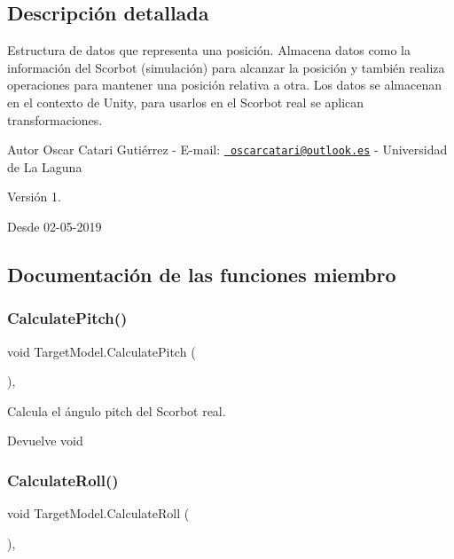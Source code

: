 \subsection{Descripción detallada}
Estructura de datos que representa una posición. Almacena datos como la información del Scorbot (simulación) para alcanzar la posición y también realiza operaciones para mantener una posición relativa a otra. Los datos se almacenan en el contexto de Unity, para usarlos en el Scorbot real se aplican transformaciones. \begin{DoxyAuthor}{Autor}
Oscar Catari Gutiérrez -\/ E-\/mail\+: \href{mailto:oscarcatari@outlook.es}{\texttt{ oscarcatari@outlook.\+es}} -\/ Universidad de La Laguna 
\end{DoxyAuthor}
\begin{DoxyVersion}{Versión}
1. 
\end{DoxyVersion}
\begin{DoxySince}{Desde}
02-\/05-\/2019 
\end{DoxySince}


\subsection{Documentación de las funciones miembro}
\mbox{\label{class_target_model_aa46b3a43a11a77e303ca082c8d29b998}} 
\subsubsection{\texorpdfstring{CalculatePitch()}{CalculatePitch()}}
{\footnotesize\ttfamily void Target\+Model.\+Calculate\+Pitch (\begin{DoxyParamCaption}{ }\end{DoxyParamCaption})\hspace{0.3cm}{\ttfamily [inline]}, {\ttfamily [private]}}

Calcula el ángulo pitch del Scorbot real. \begin{DoxyReturn}{Devuelve}
void 
\end{DoxyReturn}
\mbox{\label{class_target_model_a503c190ab713118b3eb98569c645f4a1}} 
\subsubsection{\texorpdfstring{CalculateRoll()}{CalculateRoll()}}
{\footnotesize\ttfamily void Target\+Model.\+Calculate\+Roll (\begin{DoxyParamCaption}{ }\end{DoxyParamCaption})\hspace{0.3cm}{\ttfamily [inline]}, {\ttfamily [private]}}

